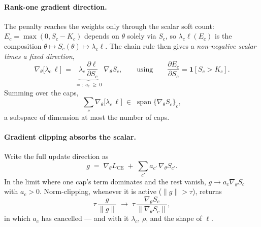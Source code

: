 \documentclass[10pt]{article}
\begin{document}
{\color{blue}
\paragraph{Rank-one gradient direction.}
The penalty reaches the weights only through the scalar soft count:
$E_c=\max(0,S_c-K_c)$ depends on $\theta$ solely via $S_c$, so
$\lambda_c\ell(E_c)$ is the composition
$\theta\mapsto S_c(\theta)\mapsto\lambda_c\ell$. The chain rule then gives a
\emph{non-negative scalar times a fixed direction},
\[
\nabla_\theta\bigl[\lambda_c\,\ell\bigr]
\;=\;
\underbrace{\lambda_c\,\frac{\partial\ell}{\partial S_c}}_{=:\;a_c\;\ge\;0}
\;\nabla_\theta S_c ,
\qquad\text{using}\qquad
\frac{\partial E_c}{\partial S_c}=\mathbf 1[S_c>K_c] .
\]
Summing over the caps,
\[
\sum_c \nabla_\theta\bigl[\lambda_c\,\ell\bigr]
\;\in\;
\operatorname{span}\{\nabla_\theta S_c\}_c ,
\]
a subspace of dimension at most the number of caps.
}

{\color{blue}
\paragraph{Gradient clipping absorbs the scalar.}
Write the full update direction as
\[
g \;=\; \nabla_\theta L_{\text{CE}} \;+\; \sum_{c'} a_{c'}\,\nabla_\theta S_{c'} .
\]
In the limit where one cap's term dominates and the rest vanish, $g\to a_c\nabla_\theta S_c$
with $a_c>0$. Norm-clipping, whenever it is active ($\lVert g\rVert>\tau$), returns
\[
\tau\,\frac{g}{\lVert g\rVert}
\;\longrightarrow\;
\tau\,\frac{\nabla_\theta S_c}{\lVert\nabla_\theta S_c\rVert},
\]
in which $a_c$ has cancelled --- and with it $\lambda_c$, $\rho$, and the shape of $\ell$.
}
\end{document}
